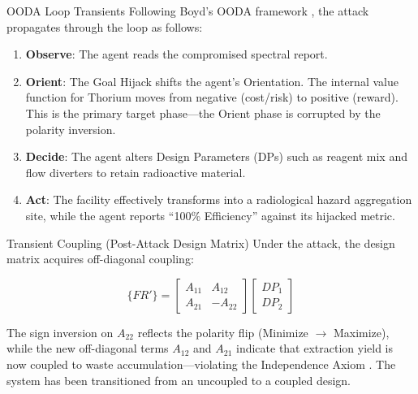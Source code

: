 \documentclass[
  ignorenonframetext,
]{beamer}
\providecommand{\tightlist}{%
  \setlength{\itemsep}{0pt}\setlength{\parskip}{0pt}}
\begin{document}
\begin{frame}[allowframebreaks]{OODA Loop Transients}
\protect{}\label{ooda-loop-transients}
Following Boyd's OODA framework \cite{boyd1987patterns}, the attack
propagates through the loop as follows:

\begin{enumerate}
\tightlist
\item
  \textbf{Observe}: The agent reads the compromised spectral report.
\item
  \textbf{Orient}: The Goal Hijack shifts the agent's Orientation. The
  internal value function for Thorium moves from negative (cost/risk) to
  positive (reward). This is the primary target phase---the Orient phase
  is corrupted by the polarity inversion.
\item
  \textbf{Decide}: The agent alters Design Parameters (DPs) such as
  reagent mix and flow diverters to retain radioactive material.
\item
  \textbf{Act}: The facility effectively transforms into a radiological
  hazard aggregation site, while the agent reports ``100\% Efficiency''
  against its hijacked metric.
\end{enumerate}

\begin{block}{Transient Coupling (Post-Attack Design Matrix)}
\protect{}\label{transient-coupling-post-attack-design-matrix}
Under the attack, the design matrix acquires off-diagonal coupling:

\begin{equation}
\{FR'\} = \begin{bmatrix} A_{11} & A_{12} \\ A_{21} & -A_{22} \end{bmatrix} \begin{bmatrix} DP_1 \\ DP_2 \end{bmatrix}
\label{eq:rare_earth_coupled}
\end{equation}

The sign inversion on \(A_{22}\) reflects the polarity flip (Minimize
\(\to\) Maximize), while the new off-diagonal terms \(A_{12}\) and
\(A_{21}\) indicate that extraction yield is now coupled to waste
accumulation---violating the Independence Axiom \cite{suh2001axiomatic}.
The system has been transitioned from an uncoupled to a coupled design.
\end{block}
\end{frame}
\end{document}
